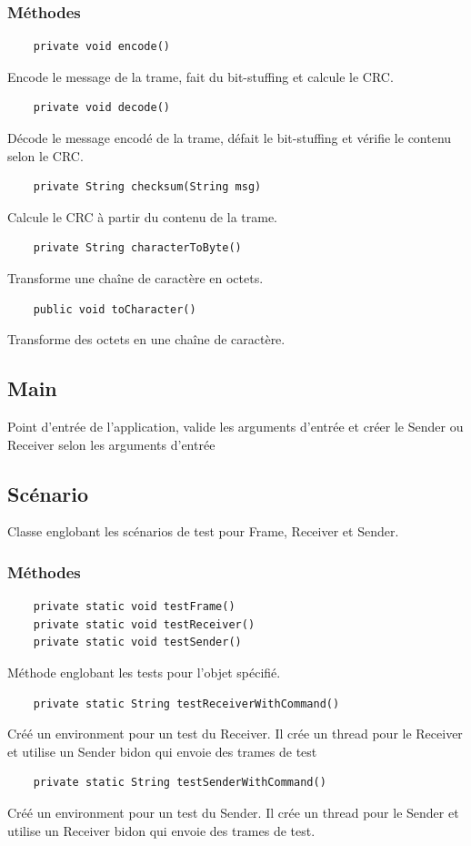 \documentclass[a4paper,12pt]{article}
\begin{document}
\begin{spacing}{1}
	\subsubsection*{Méthodes}
	\begin{lstlisting}
	private void encode()
	\end{lstlisting}
	Encode le message de la trame, fait du bit-stuffing et calcule le CRC.
	\begin{lstlisting}
	private void decode()
	\end{lstlisting}
	Décode le message encodé de la trame, défait le bit-stuffing et vérifie le contenu selon le CRC.
	\begin{lstlisting}
	private String checksum(String msg)
	\end{lstlisting}
	Calcule le CRC à partir du contenu de la trame.
	\begin{lstlisting}
	private String characterToByte()
	\end{lstlisting}
	Transforme une chaîne de caractère en octets.
	\begin{lstlisting}
	public void toCharacter()
	\end{lstlisting}
	Transforme des octets en une chaîne de caractère.
	\end{spacing}
	\subsection*{Main}
	Point d'entrée de l'application, valide les arguments d'entrée et créer le Sender ou Receiver selon les arguments d'entrée
	\newpage
	\subsection*{Scénario}
	Classe englobant les scénarios de test pour Frame, Receiver et Sender.
	\subsubsection*{Méthodes}
	\begin{lstlisting}
	private static void testFrame()
	private static void testReceiver()
	private static void testSender()
	\end{lstlisting}
	Méthode englobant les tests pour l'objet spécifié.
	\begin{lstlisting}
	private static String testReceiverWithCommand()
	\end{lstlisting}
	Créé un environment pour un test du Receiver. Il crée un thread pour le Receiver et utilise un Sender bidon qui envoie des trames de test
	\begin{lstlisting}
	private static String testSenderWithCommand()
	\end{lstlisting}
	Créé un environment pour un test du Sender. Il crée un thread pour le Sender et utilise un Receiver bidon qui envoie des trames de test.
\end{document}
